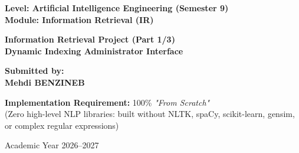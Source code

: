 \documentclass[11pt,a4paper]{article}
\begin{document}
\begin{titlepage}
    \centering
    \vspace*{1.5cm}
    
    {\large \textbf{Level: Artificial Intelligence Engineering (Semester 9)}}\\[0.3cm]
    {\Large \textbf{\color{darkblue} Module: Information Retrieval (IR)}}\\[2cm]
    
    \begin{tcolorbox}[colback=lightbg,colframe=primaryblue,arc=3mm,width=0.95\textwidth,boxrule=1.5pt]
        \centering
        \vspace{0.4cm}
        {\LARGE \textbf{Information Retrieval Project (Part 1/3)}}\\[0.4cm]
        {\Large \textbf{\color{darkblue} Dynamic Indexing Administrator Interface}}\\[0.2cm]
        \vspace{0.4cm}
    \end{tcolorbox}
    
    \vspace{3cm}
    
    \begin{minipage}{0.6\textwidth}
        \centering
        \textbf{\large Submitted by:}\\[0.2cm]
        {\Large \textbf{Mehdi BENZINEB}}
    \end{minipage}

    \vfill
    
    \begin{tcolorbox}[colback=emeraldgreen!10,colframe=emeraldgreen,arc=2mm,width=0.85\textwidth,center]
        \centering
        \textbf{Implementation Requirement:} 100\% \textit{"From Scratch"}\\
        \small (Zero high-level NLP libraries: built without NLTK, spaCy, scikit-learn, gensim, or complex regular expressions)
    \end{tcolorbox}
    
    \vspace{0.8cm}
    {\large Academic Year 2026--2027}
\end{titlepage}

\newpage
\tableofcontents
\newpage

\end{document}
